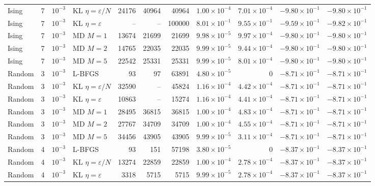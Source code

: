 \begin{table}[t]
\begin{tabular}{llllrrrrrrr}
Ising & 7 & $10^{-3}$ & KL $\eta=\varepsilon/N$ & 24176 & 40964 & 40964 & $1.00\times 10^{-4}$ & $7.01\times 10^{-4}$ & $-9.80\times 10^{-1}$ & $-9.80\times 10^{-1}$ \\
Ising & 7 & $10^{-3}$ & KL $\eta=\varepsilon$ & -- & -- & 100000 & $8.01\times 10^{-1}$ & $9.55\times 10^{-1}$ & $-9.59\times 10^{-1}$ & $-9.82\times 10^{-1}$ \\
Ising & 7 & $10^{-3}$ & MD $M=1$ & 13674 & 21699 & 21699 & $9.98\times 10^{-5}$ & $9.97\times 10^{-4}$ & $-9.80\times 10^{-1}$ & $-9.80\times 10^{-1}$ \\
Ising & 7 & $10^{-3}$ & MD $M=2$ & 14765 & 22035 & 22035 & $9.99\times 10^{-5}$ & $9.44\times 10^{-4}$ & $-9.80\times 10^{-1}$ & $-9.80\times 10^{-1}$ \\
Ising & 7 & $10^{-3}$ & MD $M=5$ & 22542 & 25331 & 25331 & $9.99\times 10^{-5}$ & $8.01\times 10^{-4}$ & $-9.80\times 10^{-1}$ & $-9.80\times 10^{-1}$ \\
\midrule
Random & 3 & $10^{-3}$ & L-BFGS & 93 & 97 & 63891 & $4.80\times 10^{-5}$ & 0 & $-8.71\times 10^{-1}$ & $-8.71\times 10^{-1}$ \\
Random & 3 & $10^{-3}$ & KL $\eta=\varepsilon/N$ & 32590 & -- & 45824 & $1.16\times 10^{-4}$ & $4.42\times 10^{-4}$ & $-8.71\times 10^{-1}$ & $-8.71\times 10^{-1}$ \\
Random & 3 & $10^{-3}$ & KL $\eta=\varepsilon$ & 10863 & -- & 15274 & $1.16\times 10^{-4}$ & $4.41\times 10^{-4}$ & $-8.71\times 10^{-1}$ & $-8.71\times 10^{-1}$ \\
Random & 3 & $10^{-3}$ & MD $M=1$ & 28495 & 36815 & 36815 & $1.00\times 10^{-4}$ & $4.83\times 10^{-4}$ & $-8.71\times 10^{-1}$ & $-8.71\times 10^{-1}$ \\
Random & 3 & $10^{-3}$ & MD $M=2$ & 27767 & 34709 & 34709 & $1.00\times 10^{-4}$ & $4.55\times 10^{-4}$ & $-8.71\times 10^{-1}$ & $-8.71\times 10^{-1}$ \\
Random & 3 & $10^{-3}$ & MD $M=5$ & 34456 & 43905 & 43905 & $9.99\times 10^{-5}$ & $3.11\times 10^{-4}$ & $-8.71\times 10^{-1}$ & $-8.71\times 10^{-1}$ \\
\midrule
Random & 4 & $10^{-3}$ & L-BFGS & 93 & 151 & 57198 & $3.80\times 10^{-5}$ & 0 & $-8.37\times 10^{-1}$ & $-8.37\times 10^{-1}$ \\
Random & 4 & $10^{-3}$ & KL $\eta=\varepsilon/N$ & 13274 & 22859 & 22859 & $1.00\times 10^{-4}$ & $2.78\times 10^{-4}$ & $-8.37\times 10^{-1}$ & $-8.37\times 10^{-1}$ \\
Random & 4 & $10^{-3}$ & KL $\eta=\varepsilon$ & 3318 & 5715 & 5715 & $9.99\times 10^{-5}$ & $2.78\times 10^{-4}$ & $-8.37\times 10^{-1}$ & $-8.37\times 10^{-1}$ \\

\end{tabular}
\end{table}
